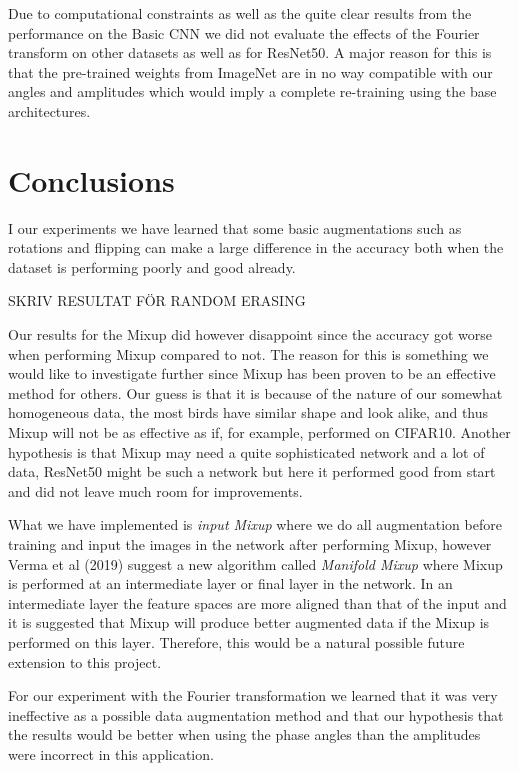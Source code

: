 \documentclass{article}
\begin{document}
\medskip

Due to computational constraints as well as the quite clear results from the performance on the Basic CNN we 
did not evaluate the effects of the Fourier transform on other datasets as well as for ResNet50. 
A major reason for this is that the pre-trained weights from ImageNet are in no way 
compatible with our angles and amplitudes which would imply a complete re-training using the base architectures.

\section{Conclusions}



I our experiments we have learned that some basic augmentations such as rotations and flipping can make a large difference in the accuracy both when the dataset is performing poorly and good already.

SKRIV RESULTAT FÖR RANDOM ERASING

Our results for the Mixup did however disappoint since the accuracy got worse when performing Mixup compared to not. 
The reason for this is something we would like to investigate further since Mixup has been proven to be an effective method for others. Our guess is that it is because of the nature of our somewhat homogeneous data, the most birds have similar shape and look alike, and thus Mixup will not be as effective as if, for example, performed on CIFAR10. Another hypothesis is that Mixup may need a quite sophisticated network and a lot of data, ResNet50 might be such a network but here it performed good from start and did not leave much room for improvements.

What we have implemented is \textit{input Mixup} where we do all augmentation before training and input the images in the network after performing Mixup, however Verma et al (2019) 
suggest a new algorithm called \textit{Manifold Mixup} where Mixup is performed at an intermediate layer or final layer in the network. In an intermediate layer 
the feature spaces are more aligned than that of the input and it is suggested that Mixup will produce better augmented data if the Mixup is performed on this layer. Therefore, this would be 
a natural possible future extension to this project. 

For our experiment with the Fourier transformation we learned that it was very ineffective as a possible data augmentation method and that our hypothesis 
that the results would be better when using the phase angles than the amplitudes were incorrect in this application. 
\end{document}
